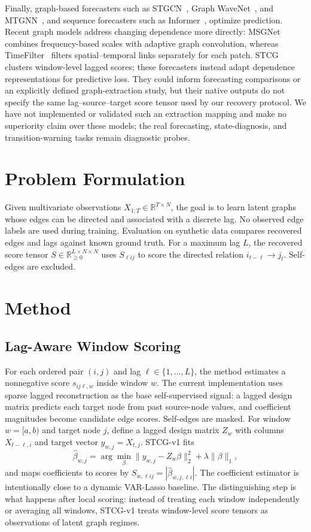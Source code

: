 \documentclass[sigconf,anonymous]{acmart}
\begin{document}
Finally, graph-based forecasters such as STGCN~\cite{yu2018spatio}, Graph WaveNet~\cite{wu2019graphwavenet}, and MTGNN~\cite{wu2020connecting}, and sequence forecasters such as Informer~\cite{zhou2021informer}, optimize prediction.
Recent graph models address changing dependence more directly: MSGNet~\cite{cai2024msgnet} combines frequency-based scales with adaptive graph convolution, whereas TimeFilter~\cite{hu2025timefilter} filters spatial--temporal links separately for each patch.
STCG clusters window-level lagged scores; these forecasters instead adapt dependence representations for predictive loss.
They could inform forecasting comparisons or an explicitly defined graph-extraction study, but their native outputs do not specify the same lag--source--target score tensor used by our recovery protocol.
We have not implemented or validated such an extraction mapping and make no superiority claim over these models; the real forecasting, state-diagnosis, and transition-warning tasks remain diagnostic probes.

\section{Problem Formulation}

Given multivariate observations $X_{1:T} \in \mathbb{R}^{T \times N}$, the goal is to learn latent graphs whose edges can be directed and associated with a discrete lag.
No observed edge labels are used during training.
Evaluation on synthetic data compares recovered edges and lags against known ground truth.
For a maximum lag $L$, the recovered score tensor $S \in \mathbb{R}_{\geq 0}^{L \times N \times N}$ uses $S_{\ell i j}$ to score the directed relation $i_{t-\ell}\rightarrow j_t$.
Self-edges are excluded.

\section{Method}

\subsection{Lag-Aware Window Scoring}

For each ordered pair $(i,j)$ and lag $\ell \in \{1,\ldots,L\}$, the method estimates a nonnegative score $s_{ij\ell,w}$ inside window $w$.
The current implementation uses sparse lagged reconstruction as the base self-supervised signal: a lagged design matrix predicts each target node from past source-node values, and coefficient magnitudes become candidate edge scores.
Self-edges are masked.
For window $w=[a,b)$ and target node $j$, define a lagged design matrix $Z_w$ with columns $X_{t-\ell,i}$ and target vector $y_{w,j}=X_{t,j}$.
STCG-v1 fits
\[
\hat{\beta}_{w,j}
= \arg\min_{\beta}
\|y_{w,j}-Z_w\beta\|_2^2 + \lambda \|\beta\|_1,
\]
and maps coefficients to scores by $S_{w,\ell i j}=|\hat{\beta}_{w,j,\ell i}|$.
The coefficient estimator is intentionally close to a dynamic VAR-Lasso baseline.
The distinguishing step is what happens after local scoring: instead of treating each window independently or averaging all windows, STCG-v1 treats window-level score tensors as observations of latent graph regimes.
\end{document}

